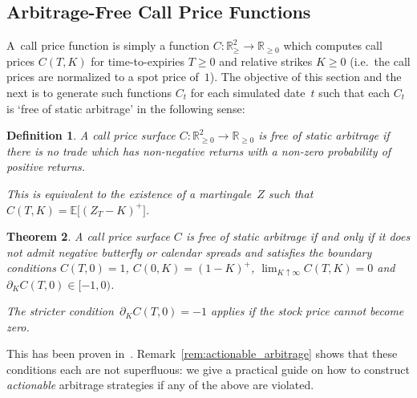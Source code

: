 \documentclass[11pt,a4paper]{article}
\newtheorem{definition}{Definition}[section]
\newtheorem{theorem}[definition]{Theorem}
\newcommand{\R}{\mathbb{R}}
\newcommand{\E}{\mathbb{E}}
\begin{document}
\subsection{Arbitrage-Free Call Price Functions}

A~call price function is simply a function $C:\R^2_{\geq} \longrightarrow  \R_{\geq 0}$
which computes call prices $C(T,K)$ for time-to-expiries $T\geq 0$ and relative
strikes $K\geq 0$ (i.e.~the call prices are normalized to a spot price of~$1$). 
The objective of this section and the next is to generate such functions $C_t$ for each
simulated date~$t$ such that each $C_t$ is `free of static arbitrage' in the following sense:

\begin{definition}
A call price surface $C: \R^2_{\geq 0}\to \R_{\geq 0}$ is \emph{free of static arbitrage} if there is no trade
which has non-negative returns with a non-zero probability of
positive returns.    

This is equivalent to the existence of a
martingale~$Z$ such that $C(T,K)= \E\big[(Z_{T}-K)^+\big]$.
\end{definition}

\begin{theorem}\label{th:arbfree}
A call price surface $C$ is free of static arbitrage if and only if 
it does not admit negative butterfly or calendar
spreads and satisfies the boundary conditions
$C(T,0)=1$, $C(0,K)=(1-K)^+$, $\lim_{K\uparrow\infty} C(T,K)=0$ and $\partial_K C(T,0)\in[-1,0)$.

The stricter condition~$\partial_K C(T,0)=-1$ applies if the stock price cannot become zero.
\end{theorem}

This has been proven in~\citet{buehler2006expensive}. Remark~\ref{rem:actionable_arbitrage}
shows that these conditions each are not superfluous: we give a practical
guide on how to construct \emph{actionable} arbitrage strategies if any of the above
are violated. 
\end{document}
